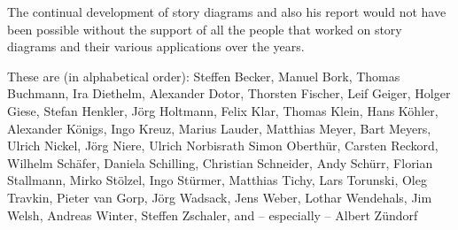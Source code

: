 The continual development of story diagrams and also his report would not have been possible without the support of all the people that worked on story diagrams and their various applications over the years.

These are (in alphabetical order): 
Steffen Becker, Manuel Bork, Thomas Buchmann, 
Ira Diethelm, Alexander Dotor, 
Thorsten Fischer, 
Leif Geiger, Holger Giese, 
Stefan Henkler, J\"{o}rg Holtmann, 
Felix Klar, Thomas Klein, Hans K\"{o}hler, Alexander K\"{o}nigs, Ingo Kreuz, 
Marius Lauder, 
Matthias Meyer, Bart Meyers, 
Ulrich Nickel, J\"{o}rg Niere, Ulrich Norbisrath
Simon Oberth\"{u}r, 
Carsten Reckord, 
Wilhelm Sch\"{a}fer, Daniela Schilling, Christian Schneider, Andy Sch\"{u}rr, Florian Stallmann, Mirko St\"{o}lzel, Ingo St\"{u}rmer, 
Matthias Tichy, Lars Torunski, Oleg Travkin, 
Pieter van Gorp, 
J\"{o}rg Wadsack, Jens Weber, Lothar Wendehals, Jim Welsh, Andreas Winter, 
Steffen Zschaler, and -- especially -- Albert Z\"{u}ndorf


